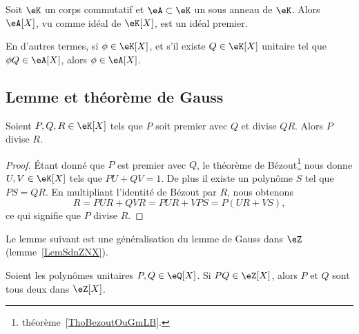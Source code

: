 \begin{lemma}   \label{LemzwkYdn}
    Soit \( \eK\) un corps commutatif et \( \eA\subset \eK\) un sous
    anneau de \( \eK\).  Alors \( \eA[X] \), vu comme idéal de \( \eK[X]
    \), est un idéal premier.

    En d'autres termes, si \( \phi\in \eK[X]\), et s'il existe \( Q\in \eK[X]\) unitaire tel que \( \phi Q\in \eA[X]\), alors \( \phi\in \eA[X]\).
\end{lemma}

\subsection{Lemme et théorème de Gauss}

\begin{theorem}  \label{ThoLLgIsig}
    Soient \( P,Q,R\in \eK[X]\) tels que \( P\) soit premier avec \( Q\) et divise \( QR\). Alors \( P\) divise \( R\).
\end{theorem}

\begin{proof}
    Étant donné que \( P\) est premier avec \( Q\), le théorème de Bézout\footnote{théorème~\ref{ThoBezoutOuGmLB}.} nous donne \( U,V\in \eK[X]\) tels que \( PU+QV=1\). De plus il existe un polynôme \( S\) tel que \( PS=QR\). En multipliant l'identité de Bézout par \( R\), nous obtenons
    \begin{equation}
        R=PUR+QVR=PUR+VPS=P(UR+VS),
    \end{equation}
    ce qui signifie que \( P\) divise \( R\).
\end{proof}

Le lemme suivant est une généralisation du lemme de Gauss dans \( \eZ\) (lemme~\ref{LemSdnZNX}).
\begin{lemma}       \label{LemEfdkZw}   
    Soient les polynômes unitaires \( P,Q\in \eQ[X]\). Si \( PQ\in\eZ[X]\), alors \( P\) et \( Q\) sont tous deux dans \( \eZ[X]\).
\end{lemma}

